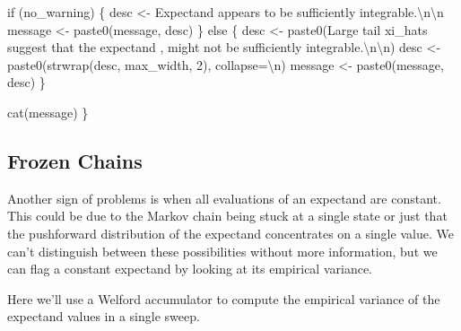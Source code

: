 \documentclass[
  letterpaper,
  DIV=11,
  numbers=noendperiod]{scrartcl}
\newenvironment{Shaded}{\begin{snugshade}}{\end{snugshade}}
\newcommand{\CharTok}[1]{\textcolor[rgb]{0.13,0.47,0.30}{#1}}
\newcommand{\ControlFlowTok}[1]{\textcolor[rgb]{0.00,0.23,0.31}{#1}}
\newcommand{\DecValTok}[1]{\textcolor[rgb]{0.68,0.00,0.00}{#1}}
\newcommand{\NormalTok}[1]{\textcolor[rgb]{0.00,0.23,0.31}{#1}}
\newcommand{\OperatorTok}[1]{\textcolor[rgb]{0.37,0.37,0.37}{#1}}
\newcommand{\StringTok}[1]{\textcolor[rgb]{0.13,0.47,0.30}{#1}}
\begin{document}
\begin{Shaded}
\begin{Highlighting}[]
  \ControlFlowTok{if}\NormalTok{ (no\_warning) \{}
\NormalTok{    desc }\OperatorTok{\textless{}{-}} \StringTok{\textquotesingle{}Expectand appears to be sufficiently integrable.}\CharTok{\textbackslash{}n\textbackslash{}n}\StringTok{\textquotesingle{}}
\NormalTok{    message }\OperatorTok{\textless{}{-}}\NormalTok{ paste0(message, desc)}
\NormalTok{  \} }\ControlFlowTok{else}\NormalTok{ \{}
\NormalTok{    desc }\OperatorTok{\textless{}{-}}\NormalTok{ paste0(}\StringTok{\textquotesingle{}Large tail xi\_hats suggest that the expectand \textquotesingle{}}\NormalTok{,}
                   \StringTok{\textquotesingle{}might not be sufficiently integrable.}\CharTok{\textbackslash{}n\textbackslash{}n}\StringTok{\textquotesingle{}}\NormalTok{)}
\NormalTok{    desc }\OperatorTok{\textless{}{-}}\NormalTok{ paste0(strwrap(desc, max\_width, }\DecValTok{2}\NormalTok{), collapse}\OperatorTok{=}\StringTok{\textquotesingle{}}\CharTok{\textbackslash{}n}\StringTok{\textquotesingle{}}\NormalTok{)}
\NormalTok{    message }\OperatorTok{\textless{}{-}}\NormalTok{ paste0(message, desc)}
\NormalTok{  \}}
  
\NormalTok{  cat(message)}
\NormalTok{\}}
\end{Highlighting}
\end{Shaded}

\subsection{Frozen Chains}\label{frozen-chains}

Another sign of problems is when all evaluations of an expectand are
constant. This could be due to the Markov chain being stuck at a single
state or just that the pushforward distribution of the expectand
concentrates on a single value. We can't distinguish between these
possibilities without more information, but we can flag a constant
expectand by looking at its empirical variance.

Here we'll use a Welford accumulator to compute the empirical variance
of the expectand values in a single sweep.
\end{document}
